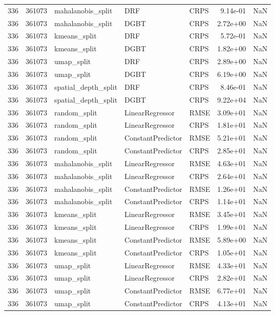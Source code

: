 \begin{tabular}{rrlllrr}
336 & 361073 & mahalanobis\_split & DRF & CRPS & 9.14e-01 & NaN \\
336 & 361073 & mahalanobis\_split & DGBT & CRPS & 2.72e+00 & NaN \\
336 & 361073 & kmeans\_split & DRF & CRPS & 5.72e-01 & NaN \\
336 & 361073 & kmeans\_split & DGBT & CRPS & 1.82e+00 & NaN \\
336 & 361073 & umap\_split & DRF & CRPS & 2.89e+00 & NaN \\
336 & 361073 & umap\_split & DGBT & CRPS & 6.19e+00 & NaN \\
336 & 361073 & spatial\_depth\_split & DRF & CRPS & 8.46e-01 & NaN \\
336 & 361073 & spatial\_depth\_split & DGBT & CRPS & 9.22e+04 & NaN \\
336 & 361073 & random\_split & LinearRegressor & RMSE & 3.09e+01 & NaN \\
336 & 361073 & random\_split & LinearRegressor & CRPS & 1.81e+01 & NaN \\
336 & 361073 & random\_split & ConstantPredictor & RMSE & 5.21e+01 & NaN \\
336 & 361073 & random\_split & ConstantPredictor & CRPS & 2.85e+01 & NaN \\
336 & 361073 & mahalanobis\_split & LinearRegressor & RMSE & 4.63e+01 & NaN \\
336 & 361073 & mahalanobis\_split & LinearRegressor & CRPS & 2.64e+01 & NaN \\
336 & 361073 & mahalanobis\_split & ConstantPredictor & RMSE & 1.26e+01 & NaN \\
336 & 361073 & mahalanobis\_split & ConstantPredictor & CRPS & 1.14e+01 & NaN \\
336 & 361073 & kmeans\_split & LinearRegressor & RMSE & 3.45e+01 & NaN \\
336 & 361073 & kmeans\_split & LinearRegressor & CRPS & 1.99e+01 & NaN \\
336 & 361073 & kmeans\_split & ConstantPredictor & RMSE & 5.89e+00 & NaN \\
336 & 361073 & kmeans\_split & ConstantPredictor & CRPS & 1.05e+01 & NaN \\
336 & 361073 & umap\_split & LinearRegressor & RMSE & 4.33e+01 & NaN \\
336 & 361073 & umap\_split & LinearRegressor & CRPS & 2.82e+01 & NaN \\
336 & 361073 & umap\_split & ConstantPredictor & RMSE & 6.77e+01 & NaN \\
336 & 361073 & umap\_split & ConstantPredictor & CRPS & 4.13e+01 & NaN \\

\end{tabular}
